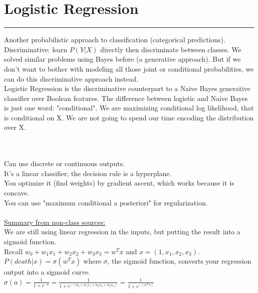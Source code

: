 \section{Logistic Regression}
\smallskip \hrule height 2pt \smallskip

Another probabilistic approach to classification (categorical predictions).  
 \hfill \\
Discriminative: learn $P(Y|X)$ directly then discriminate between classes.    %
We solved similar problems using Bayes before (a generative approach).  
	But if we don't want to bother with modeling all those joint or conditional probabilities, we can do this discriminative approach instead. \hfill \\  %

Logistic Regression is the discriminative counterpart to a Naive Bayes generative classifier over Boolean features.  %
The difference between logistic and Naive Bayes is just one word: "conditional".   %
We are maximizing conditional log likelihood, that is conditional on X.  
	We are not going to spend our time encoding the distribution over X.   %

\hfill \\   \hfill \\

Can use discrete or continuous outputs. \hfill \\ %
It's a linear classifier; the decision rule is a hyperplane. \hfill \\  %
You optimize it (find weights) by gradient ascent, which works because it is concave.    \hfill \\  %
You can use "maximum conditional a posteriori" for regularization.    \hfill \\  %

\hfill \\ 

\underline{Summary from non-class sources:} \hfill \\
We are still using linear regression in the inputs, but putting the result into a sigmoid function. \hfill \\
Recall $w_0 + w_1 x_1 + w_2 x_2 + w_3 x_3 = w^Tx$ and $x = (1, x_1, x_2, x_3)$.  \hfill \\
$P(death|x) = \sigma(w^Tx)$  %
where $\sigma$, the sigmoid function,  converts your regression output into a sigmoid curve. \hfill \\
$\displaystyle \sigma(a) = \frac{1}{1+ e^{-a}} = \frac{1}{1+ e^{-(w_0 + w_1 x_1 + w_2 x_2 + w_3 x_3)}} = \frac{1}{1+ e^{-(w^Tx)}}$   \hfill \\ %
\hfill \\

